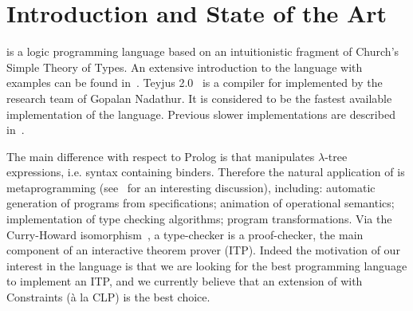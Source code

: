 \documentclass{llncs}
\begin{document}
\section{Introduction and State of the Art}
\lp{} is a logic programming language based on an intuitionistic fragment
of Church's Simple Theory of Types. An extensive introduction to the language
with examples can be found in~\cite{dalebook}. Teyjus 2.0~\cite{teyjus} is a compiler for \lp{} implemented by the research team of Gopalan Nadathur. It is considered to be the fastest available implementation of the language. Previous slower implementations are described in~\cite{}. 

The main difference with respect to Prolog is that \lp{} manipulates $\lambda$-tree expressions, i.e. syntax containing binders. Therefore the natural application of \lp{} is metaprogramming (see~\cite{thefrenchguy} for an interesting discussion), including: automatic generation of programs from specifications; animation of operational semantics; implementation of type checking algorithms; program transformations. Via the Curry-Howard isomorphism~\cite{curryhoward}, a type-checker is a proof-checker, the main component of an interactive theorem prover (ITP). Indeed the motivation of our interest in the language is that we are looking for the best programming language to implement an ITP, and we currently believe that an extension of \lp{} with Constraints (\`a la CLP) is the best choice.
\end{document}
